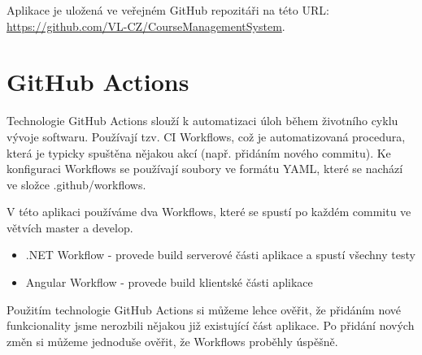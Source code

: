 Aplikace je uložená ve veřejném GitHub repozitáři na této URL: \url{https://github.com/VL-CZ/CourseManagementSystem}.

\section{GitHub Actions}
Technologie GitHub Actions slouží k automatizaci úloh během životního cyklu vývoje softwaru. Používají tzv. CI Workflows, což je automatizovaná procedura, která je typicky spuštěna nějakou akcí (např. přidáním nového commitu).
Ke konfiguraci Workflows se používají soubory ve formátu YAML, které se nachází ve složce .github/workflows.
\cite{GitHubActionsDocs}

V této aplikaci používáme dva Workflows, které se spustí po každém commitu ve větvích master a develop.
\begin{itemize}
	\item .NET Workflow - provede build serverové části aplikace a spustí všechny testy
	\item Angular Workflow - provede build klientské části aplikace
\end{itemize}

Použitím technologie GitHub Actions si můžeme lehce ověřit, že přidáním nové funkcionality jsme nerozbili nějakou již existující část aplikace. Po přidání nových změn si můžeme jednoduše ověřit, že Workflows proběhly úspěšně.
